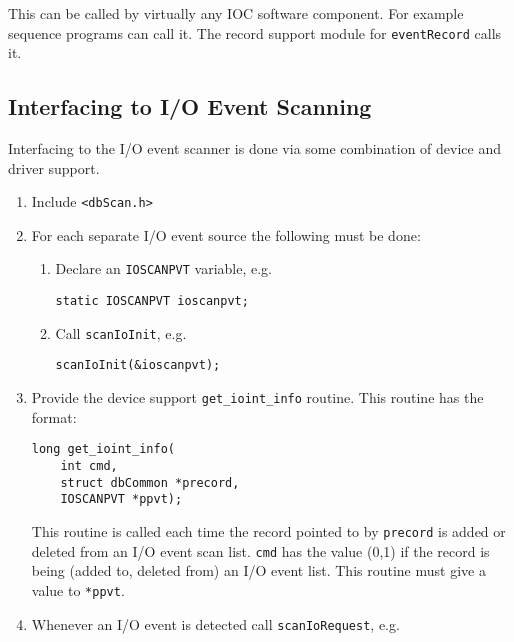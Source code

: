 This can be called by virtually any IOC software component. For example sequence programs can call it. The record 
support module for \verb|eventRecord| calls it.

\subsection{Interfacing to I/O Event Scanning}


Interfacing to the I/O event scanner is done via some combination of device and driver support.

\begin{enumerate}
\item Include \verb|<dbScan.h>|

\item For each separate I/O event source the following must be done:

\begin{enumerate}

\item Declare an \verb|IOSCANPVT| variable, e.g.

\begin{verbatim}
static IOSCANPVT ioscanpvt;
\end{verbatim}

\item Call \verb|scanIoInit|, e.g.

\begin{verbatim}
scanIoInit(&ioscanpvt);
\end{verbatim}
\end{enumerate}

\item Provide the device support \verb|get_ioint_info| routine. This routine has the format:

\begin{verbatim}
long get_ioint_info(
    int cmd,
    struct dbCommon *precord,
    IOSCANPVT *ppvt);
\end{verbatim}

This routine is called each time the record pointed to by \verb|precord| is added or deleted from an I/O event scan list. 
\verb|cmd| has the value (0,1) if the record is being (added to, deleted from) an I/O event list. This routine must give a value to \verb|*ppvt|.

\item Whenever an I/O event is detected call \verb|scanIoRequest|, e.g.


\end{enumerate}
